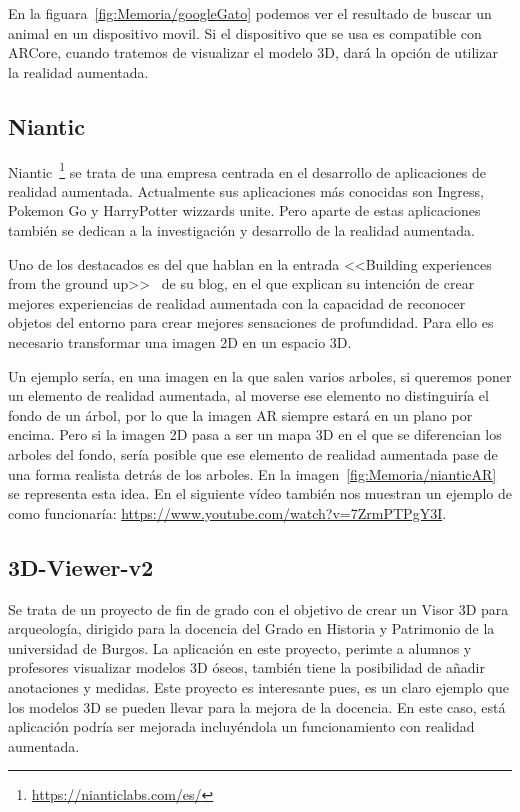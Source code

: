 En la figuara~\ref{fig:Memoria/googleGato} podemos ver el resultado de buscar un animal en un dispositivo movil. Si el dispositivo que se usa es compatible con ARCore, cuando tratemos de visualizar el modelo 3D, dará la opción de utilizar la realidad aumentada.


\subsection{Niantic}
Niantic~\footnote{\url{https://nianticlabs.com/es/}} se trata de una empresa centrada en el desarrollo de aplicaciones de realidad aumentada. Actualmente sus aplicaciones más conocidas son Ingress, Pokemon Go y HarryPotter wizzards unite.
Pero aparte de estas aplicaciones también se dedican a la investigación y desarrollo de la realidad aumentada.

Uno de los destacados es del que hablan en la entrada <<Building experiences from the ground up>>~\cite{nianticAR} de su blog, en el que explican su intención de crear mejores experiencias de realidad aumentada con la capacidad de reconocer objetos del entorno para crear mejores sensaciones de profundidad. Para ello es necesario transformar una imagen 2D en un espacio 3D. 

Un ejemplo sería, en una imagen en la que salen varios arboles, si queremos poner un elemento de realidad aumentada, al moverse ese elemento no distinguiría el fondo de un árbol, por lo que la imagen AR siempre estará en un plano por encima. Pero si la imagen 2D pasa a ser un mapa 3D en el que se diferencian los arboles del fondo, sería posible que ese elemento de realidad aumentada pase de una forma realista detrás de los arboles. En la imagen~\ref{fig:Memoria/nianticAR} se representa esta idea. En el siguiente vídeo también nos muestran un ejemplo de como funcionaría: \url{https://www.youtube.com/watch?v=7ZrmPTPgY3I}. 




\subsection{3D-Viewer-v2}

Se trata de un proyecto de fin de grado con el objetivo de crear un Visor 3D para arqueología, dirigido para la docencia del Grado en Historia y Patrimonio de la universidad de Burgos.
La aplicación en este proyecto, perimte a alumnos y profesores visualizar modelos 3D óseos, también tiene la posibilidad de añadir anotaciones y medidas. Este proyecto es interesante pues, es un claro ejemplo que los modelos 3D se pueden llevar para la mejora de la docencia. En este caso, está aplicación podría ser mejorada incluyéndola un funcionamiento con realidad aumentada.

